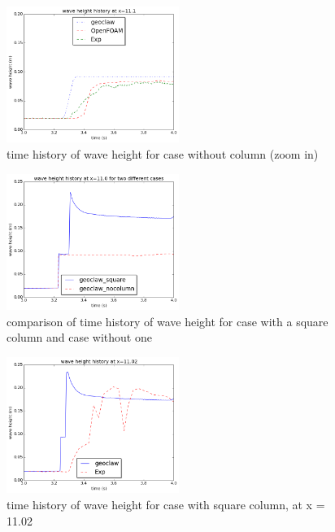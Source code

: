 \documentclass[11pt]{article}
\begin{document}
\begin{figure}[h!]
    \centering
    \includegraphics[width=0.5\textwidth]{./plots/waveheight_nocolumn_zoomin}
    \caption{time history of wave height for case without column (zoom in)}
    \label{fig:waveheight_nocolumn_zoomin}
\end{figure}
\begin{figure}[h!]
    \centering
    \includegraphics[width=0.5\textwidth]{./plots/waveheight_x11_comparison}
    \caption{comparison of time history of wave height for case with a square column and case without one}
    \label{fig:waveheight_x11_comparison}
\end{figure}
\begin{figure}[h!]
    \centering
    \includegraphics[width=0.5\textwidth]{./plots/waveheight_square_x1102}
    \caption{time history of wave height for case with square column, at x = 11.02}
    \label{fig:waveheight_square_x=11.02}
\end{figure}
\par
\end{document}
